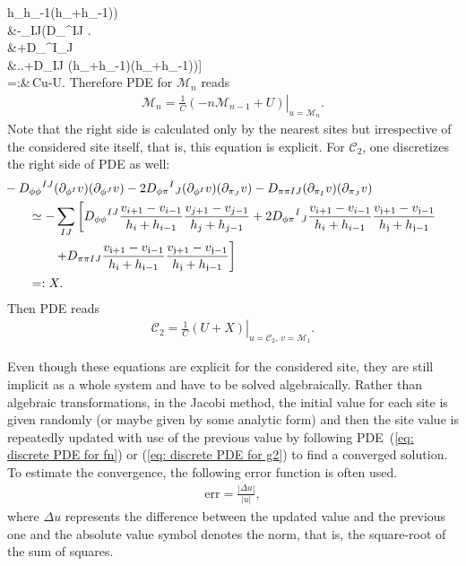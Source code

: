 \documentclass[aps, prd
, preprint
, nofootinbib 
, longbibliography
]{revtex4-1}
\newcommand{\calC}{\mathcal{C}}
\newcommand{\calM}{\mathcal{M}}
\newcommand{\bae}[1]{\begin{align} #1 \end{align}}
\begin{document}
{	{h_h_{-1}(h_+h_{-1})}\right) \nonumber \\
	&\hspace{20pt}-\sum_{I\neq J}\left(D_{\phi\phi}{}^{IJ} \right. \nonumber \\
	&\hspace{40pt}+D_{\phi\pi}{}^I{}_J
	\nonumber \\
	&\hspace{40pt}\left.\left.+D_{\pi\pi IJ}
	{(h_+h_{-1})(h_+h_{-1})}\right)\right] \nonumber \\
	=:&\,Cu-U.
}
Therefore PDE for $\calM_n$ reads
\bae{\label{eq: discrete PDE for fn}
	\calM_n=\left.\frac{1}{C}(-n\calM_{n-1}+U)\right|_{u=\calM_n}.
}
Note that the right side is calculated only by the nearest sites but irrespective of the considered site itself, that is, this equation is explicit.
For $\calC_2$, one discretizes the right side of PDE as well:
\bae{
	&\hspace{-20pt}-D_{\phi\phi}{}^{IJ}(\partial_{\phi^I}v)(\partial_{\phi^J}v)-2D_{\phi\pi}{}^I{}_J(\partial_{\phi^I}v)(\partial_{\pi_J}v)-D_{\pi\pi IJ}(\partial_{\pi_I}v)(\partial_{\pi_J}v) \nonumber \\
	&\simeq-\sum_{IJ}\left[D_{\phi\phi}{}^{IJ}\frac{v_{i+1}-v_{i-1}}{h_i+h_{i-1}}\frac{v_{j+1}-v_{j-1}}{h_j+h_{j-1}} 
	+2D_{\phi\pi}{}^I{}_J\frac{v_{i+1}-v_{i-1}}{h_i+h_{i-1}}\frac{v_{\mathfrak{j}+1}-v_{\mathfrak{j}-1}}{h_\mathfrak{j}+h_{\mathfrak{j}-1}} \right.\nonumber \\
	&\hspace{20pt}\left.+D_{\pi\pi IJ}\frac{v_{\mathfrak{i}+1}-v_{\mathfrak{i}-1}}{h_\mathfrak{i}+h_{\mathfrak{i}-1}}\frac{v_{\mathfrak{j}+1}-v_{\mathfrak{j}-1}}{h_\mathfrak{j}+h_{\mathfrak{j}-1}}
	\right] \nonumber \\
	&=:X.
}
Then PDE reads
\bae{\label{eq: discrete PDE for g2}
	\calC_2=\left.\frac{1}{C}(U+X)\right|_{u=\calC_2,\,v=\calM_1}.
}

Even though these equations are explicit for the considered site, they are still implicit as a whole system and have to be solved algebraically. 
Rather than algebraic transformations, in the Jacobi method, the initial value for each site is given randomly (or maybe given by some analytic form) and then the site value
is repeatedly updated with use of the previous value by following PDE~(\ref{eq: discrete PDE for fn}) or (\ref{eq: discrete PDE for g2}) to find a converged solution.
To estimate the convergence, the following error function is often used.
\bae{
	\text{err}=\frac{|\Delta u|}{|u|},
}
where $\Delta u$ represents the difference between the updated value and the previous one and the absolute value symbol denotes the norm, that is, the square-root of the sum of squares.
\end{document}
